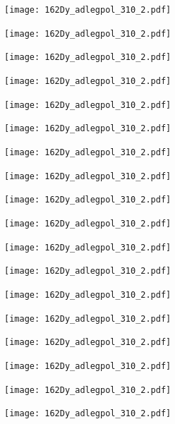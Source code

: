 \begin{center}
\texttt{[image: 162Dy\_adlegpol\_310\_2.pdf]}
\end{center}
\begin{center}
\texttt{[image: 162Dy\_adlegpol\_310\_2.pdf]}
\end{center}
\begin{center}
\texttt{[image: 162Dy\_adlegpol\_310\_2.pdf]}
\end{center}
\begin{center}
\texttt{[image: 162Dy\_adlegpol\_310\_2.pdf]}
\end{center}
\begin{center}
\texttt{[image: 162Dy\_adlegpol\_310\_2.pdf]}
\end{center}
\begin{center}
\texttt{[image: 162Dy\_adlegpol\_310\_2.pdf]}
\end{center}
\begin{center}
\texttt{[image: 162Dy\_adlegpol\_310\_2.pdf]}
\end{center}
\begin{center}
\texttt{[image: 162Dy\_adlegpol\_310\_2.pdf]}
\end{center}
\begin{center}
\texttt{[image: 162Dy\_adlegpol\_310\_2.pdf]}
\end{center}
\begin{center}
\texttt{[image: 162Dy\_adlegpol\_310\_2.pdf]}
\end{center}
\begin{center}
\texttt{[image: 162Dy\_adlegpol\_310\_2.pdf]}
\end{center}
\begin{center}
\texttt{[image: 162Dy\_adlegpol\_310\_2.pdf]}
\end{center}
\begin{center}
\texttt{[image: 162Dy\_adlegpol\_310\_2.pdf]}
\end{center}
\begin{center}
\texttt{[image: 162Dy\_adlegpol\_310\_2.pdf]}
\end{center}
\begin{center}
\texttt{[image: 162Dy\_adlegpol\_310\_2.pdf]}
\end{center}
\begin{center}
\texttt{[image: 162Dy\_adlegpol\_310\_2.pdf]}
\end{center}
\begin{center}
\texttt{[image: 162Dy\_adlegpol\_310\_2.pdf]}
\end{center}
\begin{center}
\texttt{[image: 162Dy\_adlegpol\_310\_2.pdf]}
\end{center}